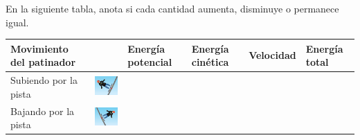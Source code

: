 En la siguiente tabla, anota si cada cantidad aumenta, disminuye o permanece igual.

\begin{table}[H]
    \centering
    \begin{tabular}{|l|l|l|l|l|l|}
        \hline
        Movimiento del patinador &                                               & Energía potencial & Energía cinética & Velocidad & Energía total \\
        \hline
        Subiendo por la pista    & \includegraphics[width=100pt]{../images/up}   &                   &                  &           &               \\
        \hline
        Bajando por la pista     & \includegraphics[width=100pt]{../images/down} &                   &                  &           &               \\
        \hline
    \end{tabular}
    \label{tab:upordown}
\end{table}